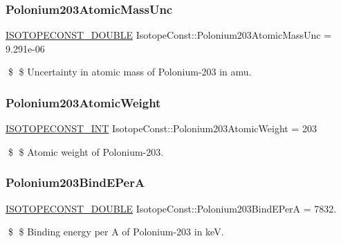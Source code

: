 \subsubsection{\texorpdfstring{Polonium203\+Atomic\+Mass\+Unc}{Polonium203AtomicMassUnc}}
{\footnotesize\ttfamily \mbox{\hyperlink{group___isotope_const-_macros_ga8f45a7272ce02c0b4c65c44636ed719a}{I\+S\+O\+T\+O\+P\+E\+C\+O\+N\+S\+T\+\_\+\+D\+O\+U\+B\+LE}} Isotope\+Const\+::\+Polonium203\+Atomic\+Mass\+Unc = 9.\+291e-\/06}

\$ \$ Uncertainty in atomic mass of Polonium-\/203 in amu. \mbox{\label{group___isotope_const-_polonium-_po203_gad083c15521cf9ab6bb1863c5d521081b}} 
\subsubsection{\texorpdfstring{Polonium203\+Atomic\+Weight}{Polonium203AtomicWeight}}
{\footnotesize\ttfamily \mbox{\hyperlink{group___isotope_const-_macros_ga5f18360b3e99483a35c32d789e62621c}{I\+S\+O\+T\+O\+P\+E\+C\+O\+N\+S\+T\+\_\+\+I\+NT}} Isotope\+Const\+::\+Polonium203\+Atomic\+Weight = 203}

\$ \$ Atomic weight of Polonium-\/203. \mbox{\label{group___isotope_const-_polonium-_po203_ga8765efbb3d9a2edc3069045904960be5}} 
\subsubsection{\texorpdfstring{Polonium203\+Bind\+E\+PerA}{Polonium203BindEPerA}}
{\footnotesize\ttfamily \mbox{\hyperlink{group___isotope_const-_macros_ga8f45a7272ce02c0b4c65c44636ed719a}{I\+S\+O\+T\+O\+P\+E\+C\+O\+N\+S\+T\+\_\+\+D\+O\+U\+B\+LE}} Isotope\+Const\+::\+Polonium203\+Bind\+E\+PerA = 7832.}

\$ \$ Binding energy per A of Polonium-\/203 in keV. \mbox{\label{group___isotope_const-_polonium-_po203_ga8baefc94482972092283a28123c3619e}} 
